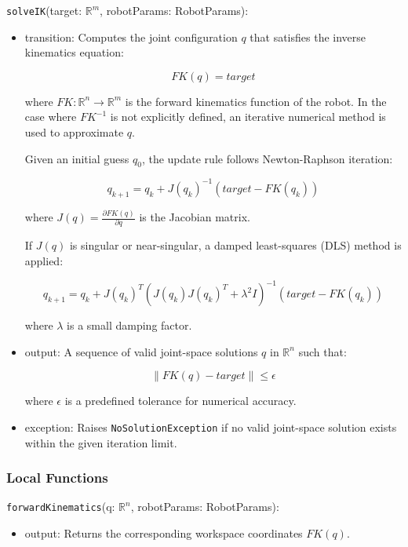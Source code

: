 \documentclass[12pt, titlepage]{article}
\begin{document}
\noindent \texttt{solveIK}(target: $\mathbb{R}^m$, robotParams: RobotParams):
\begin{itemize}
    \item transition: Computes the joint configuration \( q \) that satisfies the inverse kinematics equation:

    \[
    FK(q) = target
    \]

    where \( FK: \mathbb{R}^n \to \mathbb{R}^m \) is the forward kinematics function of the robot. In the case where \( FK^{-1} \) is not explicitly defined, an iterative numerical method is used to approximate \( q \).

    Given an initial guess \( q_0 \), the update rule follows Newton-Raphson iteration:

    \[
    q_{k+1} = q_k + J(q_k)^{-1} (target - FK(q_k))
    \]

    where \( J(q) = \frac{\partial FK(q)}{\partial q} \) is the Jacobian matrix.

    If \( J(q) \) is singular or near-singular, a damped least-squares (DLS) method is applied:

    \[
    q_{k+1} = q_k + J(q_k)^T (J(q_k) J(q_k)^T + \lambda^2 I)^{-1} (target - FK(q_k))
    \]

    where \( \lambda \) is a small damping factor.

    \item output: A sequence of valid joint-space solutions \( q \) in \( \mathbb{R}^n \) such that:

    \[
    \| FK(q) - target \| \leq \epsilon
    \]

    where \( \epsilon \) is a predefined tolerance for numerical accuracy.

    \item exception: Raises \texttt{NoSolutionException} if no valid joint-space solution exists within the given iteration limit.
\end{itemize}



\subsubsection{Local Functions}

\noindent \texttt{forwardKinematics}(q: $\mathbb{R}^n$, robotParams: RobotParams):
\begin{itemize}
  \item output: Returns the corresponding workspace coordinates \( FK(q) \).
\end{itemize}
\end{document}

